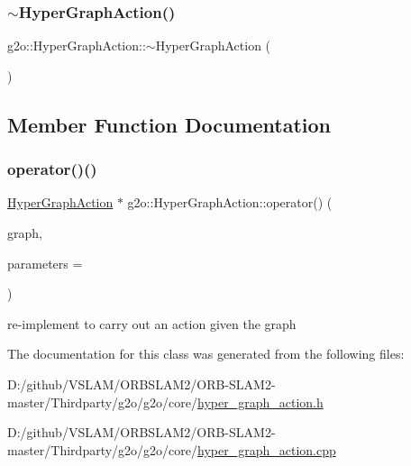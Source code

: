 \subsubsection{\texorpdfstring{$\sim$\+Hyper\+Graph\+Action()}{~HyperGraphAction()}}
{\footnotesize\ttfamily g2o\+::\+Hyper\+Graph\+Action\+::$\sim$\+Hyper\+Graph\+Action (\begin{DoxyParamCaption}{ }\end{DoxyParamCaption})\hspace{0.3cm}{\ttfamily [virtual]}}



\subsection{Member Function Documentation}
\mbox{\label{classg2o_1_1_hyper_graph_action_aea392eafa65ab432a3c4d1dabde9bdbe}} 
\subsubsection{\texorpdfstring{operator()()}{operator()()}}
{\footnotesize\ttfamily \mbox{\hyperlink{classg2o_1_1_hyper_graph_action}{Hyper\+Graph\+Action}} $\ast$ g2o\+::\+Hyper\+Graph\+Action\+::operator() (\begin{DoxyParamCaption}\item[{const \mbox{\hyperlink{classg2o_1_1_hyper_graph}{Hyper\+Graph}} $\ast$}]{graph,  }\item[{\mbox{\hyperlink{classg2o_1_1_hyper_graph_action_1_1_parameters}{Parameters}} $\ast$}]{parameters = {} }\end{DoxyParamCaption})\hspace{0.3cm}{\ttfamily [virtual]}}

re-\/implement to carry out an action given the graph 

The documentation for this class was generated from the following files\+:\begin{DoxyCompactItemize}
\item 
D\+:/github/\+V\+S\+L\+A\+M/\+O\+R\+B\+S\+L\+A\+M2/\+O\+R\+B-\/\+S\+L\+A\+M2-\/master/\+Thirdparty/g2o/g2o/core/\mbox{\hyperlink{hyper__graph__action_8h}{hyper\+\_\+graph\+\_\+action.\+h}}\item 
D\+:/github/\+V\+S\+L\+A\+M/\+O\+R\+B\+S\+L\+A\+M2/\+O\+R\+B-\/\+S\+L\+A\+M2-\/master/\+Thirdparty/g2o/g2o/core/\mbox{\hyperlink{hyper__graph__action_8cpp}{hyper\+\_\+graph\+\_\+action.\+cpp}}\end{DoxyCompactItemize}
